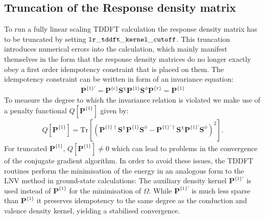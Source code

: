 \documentclass[letterpaper,10pt,english]{sphinxmanual}
\begin{document}
\subsection{Truncation of the Response density matrix}
\label{\detokenize{lr_tddft:truncation-of-the-response-density-matrix}}
To run a fully linear scaling TDDFT calculation the response density
matrix has to be truncated by setting
\(\tt{lr\_tddft\_kernel\_cutoff}\). This truncation introduces
numerical errors into the calculation, which mainly manifest themselves
in the form that the response density matrices do no longer exactly obey
a first order idempotency constraint that is placed on them. The
idempotency constraint can be written in form of an invariance equation:
\begin{equation*}
\begin{split}\textbf{P}^{\{1\}'}=\textbf{P}^{\{\mathrm{c}\}}\textbf{S}^{\chi}\textbf{P}^{\{1\}}\textbf{S}^{\phi}\textbf{P}^{\{\mathrm{v}\}}=\textbf{P}^{\{1\}}\end{split}
\end{equation*}
To measure the degree to which the invariance relation is violated we
make use of a penalty functional
\(Q\left[ \textbf{P}^{\{1\}}\right]\) given by:
\begin{equation*}
\begin{split}Q\left[\textbf{P}^{\{1\}}\right]=\textrm{Tr}\left[\left(\textbf{P}^{\{1\}\dagger}\textbf{S}^{\chi}\textbf{P}^{\{1\}}\textbf{S}^{\phi}-\textbf{P}^{\{1\}' \dagger}\textbf{S}^{\chi}\textbf{P}^{\{1\}'}\textbf{S}^{\phi} \right)^2\right].\end{split}
\end{equation*}
For truncated \(\textbf{P}^{\{1\}}\),
\(Q\left[\textbf{P}^{\{1\}}\right]\neq 0\) which can lead to
problems in the convergence of the conjugate gradient algorithm. In
order to avoid these issues, the TDDFT routines perform the minimisation
of the energy in an analogous form to the LNV method in ground-state
calculations: The auxiliary density kernel \(\textbf{P}^{\{1\}'}\)
is used instead of \(\textbf{P}^{\{1\}}\) for the minimisation of
\(\Omega\). While \(\textbf{P}^{\{1\}'}\) is much less sparse
than \(\textbf{P}^{\{1\}}\) it preserves idempotency to the same
degree as the conduction and valence density kernel, yielding a
stabilised convergence.
\end{document}
